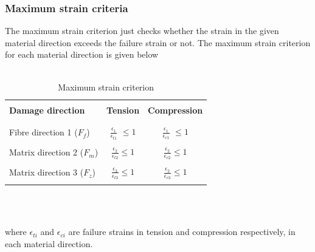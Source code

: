 \documentclass[a4paper,14pt]{extarticle}
\begin{document}
\subsubsection{Maximum strain criteria}
\indent\indent\indent The maximum strain criterion just checks whether the strain in the given material direction exceeds the failure strain or not. The maximum strain criterion for each material direction is given below
\\
\\
\begin{table}[h!]
  \begin{center}
     \begin{tabular}{l  c  c} 
     \hline
     \\
      \textbf{Damage direction} \;\;& \textbf{Tension} \;& \textbf{Compression}\\
      \\
      \hline
      \\
      Fibre direction 1 ($F_{f}$) & \Large{$\frac{\epsilon_{1}}{\epsilon_{t1}} $}\small{ $\leq 1$} &  \Large{$\frac{\epsilon_{1}}{\epsilon_{c1}} $}\small{ $\leq 1$}\\
      \\
      Matrix direction 2 ($F_{m}$)  &  \Large{$\frac{\epsilon_{2}}{\epsilon_{t2}} $}\small{$\leq 1$}  & \Large{$\frac{\epsilon_{2}}{\epsilon_{c2}} $}\small{$\leq 1$}\\
      \\
      Matrix direction 3 ($F_{z}$) &  \Large{$\frac{\epsilon_{3}}{\epsilon_{t3}} $}\small{$\leq 1$}  &   \Large{$\frac{\epsilon_{2}}{\epsilon_{c3}} $}\small{$\leq 1$}\\
       \\
       \hline
    \end{tabular}
    \\
    \caption{Maximum strain criterion}
    \label{tab:Maximum strain criterion}
  \end{center}
\end{table}\\
where $\epsilon_{ti}$ and $\epsilon_{ci}$ are failure strains in tension and compression respectively, in each material direction. 
\\
\end{document}
